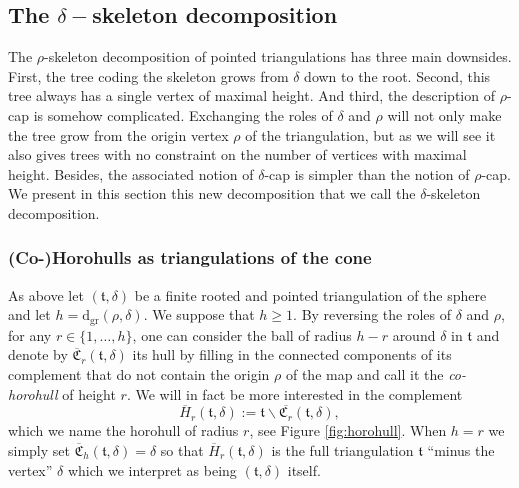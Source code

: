 \documentclass[AHL,XML,longabstracts,Unicode,NoSaveZebib]{cedram}
\begin{document}
\begin{center}
\end{center}

\subsection{The \texorpdfstring{$\delta-$}{delta-}skeleton decomposition}
\label{sec:skelretourne}

The $\rho$-skeleton decomposition of pointed triangulations has three main downsides. First, the tree coding the skeleton grows from $\delta$ down to the root.  Second, this tree always has a single vertex of maximal height. And third, the description of $\rho$-cap is somehow complicated. Exchanging the roles of $\delta$ and $\rho$ will not only make the tree grow from the origin vertex $\rho$ of the triangulation, but as we will see it also gives trees with no constraint on the number of vertices with maximal height. Besides, the associated notion of $\delta$-cap is simpler than the notion of $\rho$-cap. We present in this section this new decomposition that we call the $\delta$-skeleton decomposition.

\subsubsection{(Co-)Horohulls as triangulations of the cone}

As above let $( \mathfrak{t}, \delta)$ be a finite rooted and pointed triangulation of the sphere and let $h = \mathrm{d_{gr}}(\rho, \delta)$. We suppose that $h \geq 1$. By reversing the roles of $\delta$ and $\rho$, for any $r \in \{1, \ldots , h \}$, one can consider the ball of radius $h-r$ around $\delta$ in $\mathfrak t$ and denote by $ \overline{\mathfrak{C}}_{r}( \mathfrak{t}, \delta)$ its hull by filling in the connected components of its complement that do not contain the origin $\rho$ of the map and call it the \emph{co-horohull} of height $r$. We will in fact be more interested in the complement $$ \overline{H}_{r}( \mathfrak{t},\delta):= \mathfrak{t} \backslash \overline{\mathfrak{C}_{r}}( \mathfrak{t}, \delta),$$ which we name the horohull of radius $r$, see Figure \ref{fig:horohull}. When $h=r$ we simply set $ \overline{\mathfrak{C}}_h(\mathfrak t, \delta) = \delta$ so that $\overline{H}_{r}( \mathfrak{t},\delta)$ is the full triangulation $ \mathfrak{t}$ ``minus the vertex'' $\delta$ which we interpret as being $(  \mathfrak{t}, \delta)$ itself.
\end{document}
